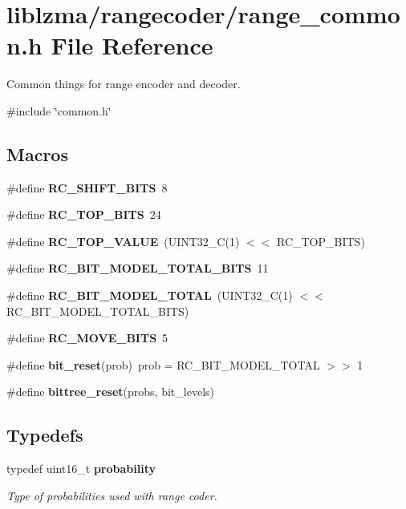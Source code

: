 \section{liblzma/rangecoder/range\+\_\+common.h File Reference}
\label{range__common_8h}


Common things for range encoder and decoder.  


{\ttfamily \#include \char`\"{}common.\+h\char`\"{}}\newline
\subsection*{Macros}
\begin{DoxyCompactItemize}
\item 
\mbox{\label{range__common_8h_a41c53be1dc32cfb1a4d53b141a60815c}} 
\#define {\bfseries R\+C\+\_\+\+S\+H\+I\+F\+T\+\_\+\+B\+I\+TS}~8
\item 
\mbox{\label{range__common_8h_a1a1ca7b414fb34f9886d03df2a3bdc81}} 
\#define {\bfseries R\+C\+\_\+\+T\+O\+P\+\_\+\+B\+I\+TS}~24
\item 
\mbox{\label{range__common_8h_a43771f3c7667e9d8a2bba4f0f0c35a0d}} 
\#define {\bfseries R\+C\+\_\+\+T\+O\+P\+\_\+\+V\+A\+L\+UE}~(U\+I\+N\+T32\+\_\+C(1) $<$$<$ R\+C\+\_\+\+T\+O\+P\+\_\+\+B\+I\+TS)
\item 
\mbox{\label{range__common_8h_a38bbe381d456abee5209c427f2625586}} 
\#define {\bfseries R\+C\+\_\+\+B\+I\+T\+\_\+\+M\+O\+D\+E\+L\+\_\+\+T\+O\+T\+A\+L\+\_\+\+B\+I\+TS}~11
\item 
\mbox{\label{range__common_8h_aeafdaaf760f1363a9cd15f25b9679b27}} 
\#define {\bfseries R\+C\+\_\+\+B\+I\+T\+\_\+\+M\+O\+D\+E\+L\+\_\+\+T\+O\+T\+AL}~(U\+I\+N\+T32\+\_\+C(1) $<$$<$ R\+C\+\_\+\+B\+I\+T\+\_\+\+M\+O\+D\+E\+L\+\_\+\+T\+O\+T\+A\+L\+\_\+\+B\+I\+TS)
\item 
\mbox{\label{range__common_8h_a411055e99baf222f4ba1d3ad8c2a84cc}} 
\#define {\bfseries R\+C\+\_\+\+M\+O\+V\+E\+\_\+\+B\+I\+TS}~5
\item 
\mbox{\label{range__common_8h_a8346b42d317c2f316c17fc468ae86860}} 
\#define {\bfseries bit\+\_\+reset}(prob)~prob = R\+C\+\_\+\+B\+I\+T\+\_\+\+M\+O\+D\+E\+L\+\_\+\+T\+O\+T\+AL $>$$>$ 1
\item 
\#define {\bfseries bittree\+\_\+reset}(probs,  bit\+\_\+levels)
\end{DoxyCompactItemize}
\subsection*{Typedefs}
\begin{DoxyCompactItemize}
\item 
typedef uint16\+\_\+t \textbf{ probability}
\begin{DoxyCompactList}\small\item\em Type of probabilities used with range coder. \end{DoxyCompactList}\end{DoxyCompactItemize}


